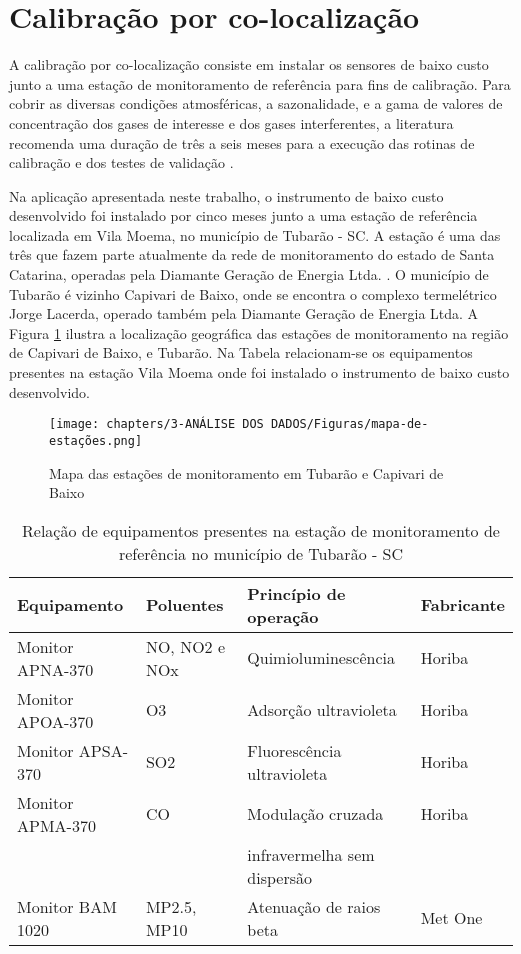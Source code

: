 \section{Calibração por co-localização}

A calibração por co-localização consiste em instalar os sensores de baixo custo junto a uma estação de monitoramento de referência para fins de calibração. Para cobrir as diversas condições atmosféricas, a sazonalidade, e a gama de valores de concentração dos gases de interesse e dos gases interferentes, a literatura recomenda uma duração de três a seis meses para a execução das rotinas de calibração e dos testes de validação \cite{Spinelle2013ProtocolPollution}.

Na aplicação apresentada neste trabalho, o instrumento de baixo custo desenvolvido foi instalado por cinco meses junto a uma estação de referência localizada em Vila Moema, no município de Tubarão - SC. A estação é uma das três que fazem parte atualmente da rede de monitoramento do estado de Santa Catarina, operadas pela Diamante Geração de Energia Ltda. \cite{IMASC24}. O município de Tubarão é vizinho Capivari de Baixo, onde se encontra o complexo termelétrico Jorge Lacerda, operado também pela Diamante Geração de Energia Ltda. A Figura \ref{fig:stations-map} ilustra a localização geográfica das estações de monitoramento na região de Capivari de Baixo, e Tubarão. Na Tabela relacionam-se os equipamentos presentes na estação Vila Moema onde foi instalado o instrumento de baixo custo desenvolvido.

\begin{figure}[h]
    \centering
    \caption{Mapa das estações de monitoramento em Tubarão e Capivari de Baixo}
    \texttt{[image: chapters/3-ANÁLISE DOS DADOS/Figuras/mapa-de-estações.png]}
    \label{fig:stations-map}
\end{figure}

\begin{table}[!ht]
    \centering
    \caption{Relação de equipamentos presentes na estação de monitoramento de referência no município de Tubarão - SC}
    \begin{tabular}{l|l|l|l}
        \textbf{Equipamento} & \textbf{Poluentes} & \textbf{Princípio de operação} & \textbf{Fabricante} \\
        \hline
        Monitor APNA-370 & NO, NO2 e NOx & Quimioluminescência & Horiba \\
        Monitor APOA-370 & O3 & Adsorção ultravioleta & Horiba \\
        Monitor APSA-370 & SO2 & Fluorescência ultravioleta & Horiba \\
        Monitor APMA-370 & CO & Modulação cruzada & Horiba \\
         & & infravermelha sem dispersão & \\
        Monitor BAM 1020 & MP2.5, MP10 & Atenuação de raios beta & Met One \\
        \hline
    \end{tabular}
    \label{tab:reference-equipments}
\end{table}

